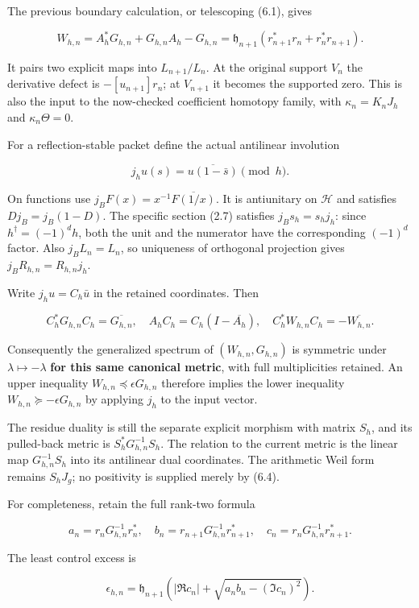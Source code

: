 The previous boundary calculation, or telescoping (6.1), gives

\[\boxed{W_{h,n}=A_h^*G_{h,n}+G_{h,n}A_h-G_{h,n}
=\mathfrak h_{n+1}(r_{n+1}^*r_n+r_n^*r_{n+1}).}\tag{6.3}\]

It pairs two explicit maps into \(L_{n+1}/L_n\). At the original support
\(V_n\) the derivative defect is \(-[u_{n+1}]r_n\); at \(V_{n+1}\) it
becomes the supported zero. This is also the input to the now-checked
coefficient homotopy family, with \(\kappa_n=K_nJ_h\) and
\(\kappa_n\Theta=0\).

For a reflection-stable packet define the actual antilinear involution

\[j_hu(s)=\overline{u(1-\bar s)}\pmod h.\]

On functions use \(j_BF(x)=x^{-1}\overline{F(1/x)}\). It is antiunitary
on \(\mathcal H\) and satisfies \(Dj_B=j_B(1-D)\). The specific section
(2.7) satisfies \(j_Bs_h=s_hj_h\): since \(h^\dagger=(-1)^dh\), both the
unit and the numerator have the corresponding \((-1)^d\) factor. Also
\(j_BL_n=L_n\), so uniqueness of orthogonal projection gives
\(j_BR_{h,n}=R_{h,n}j_h\).

Write \(j_hu=C_h\bar u\) in the retained coordinates. Then

\[\boxed{C_h^*G_{h,n}C_h=\overline{G_{h,n}},\quad
A_hC_h=C_h(I-\overline{A_h}),\quad
C_h^*W_{h,n}C_h=-\overline{W_{h,n}}.}\tag{6.4}\]

Consequently the generalized spectrum of \((W_{h,n},G_{h,n})\) is
symmetric under \(\lambda\mapsto-\lambda\) \textbf{for this same
canonical metric}, with full multiplicities retained. An upper
inequality \(W_{h,n}\preceq\epsilon G_{h,n}\) therefore implies the
lower inequality \(W_{h,n}\succeq-\epsilon G_{h,n}\) by applying \(j_h\)
to the input vector.

The residue duality is still the separate explicit morphism with matrix
\(S_h\), and its pulled-back metric is \(S_h^*G_{h,n}^{-1}S_h\). The
relation to the current metric is the linear map \(G_{h,n}^{-1}S_h\)
into its antilinear dual coordinates. The arithmetic Weil form remains
\(S_hJ_g\); no positivity is supplied merely by (6.4).

For completeness, retain the full rank-two formula

\[a_n=r_nG_{h,n}^{-1}r_n^*,\quad b_n=r_{n+1}G_{h,n}^{-1}r_{n+1}^*,\quad c_n=r_nG_{h,n}^{-1}r_{n+1}^*.\]

The least control excess is

\[\epsilon_{h,n}=\mathfrak h_{n+1}\left(|\Re c_n|+\sqrt{a_nb_n-(\Im c_n)^2}\right).\tag{6.5}\]

